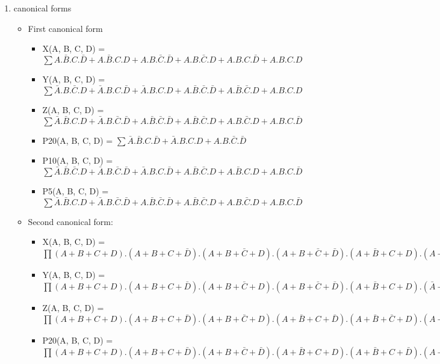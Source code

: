\begin{enumerate}
        
\item canonical forms 
\begin{itemize}
\item First canonical form 
\begin{itemize}
\item X(A, B, C, D) = $\sum A.\bar B.C.\bar D + A.\bar B.C.D + A.B.\bar C.\bar D + A.B.\bar C.D + A.B.C.\bar D + A.B.C.D$
\item Y(A, B, C, D) = $\sum \bar A.B.\bar C.D + \bar A.B.C.\bar D + \bar A.B.C.D + A.\bar B.\bar C.\bar D + A.\bar B.\bar C.D + A.B.C.D$
\item Z(A, B, C, D) = $\sum \bar A.\bar B.C.D + \bar A.B.\bar C.\bar D + A.\bar B.\bar C.\bar D + A.\bar B.\bar C.D + A.B.\bar C.D + A.B.C.\bar D$
\item P20(A, B, C, D) = $\sum \bar A.\bar B.C.\bar D + \bar A.B.C.D + A.B.\bar C.\bar D$
\item P10(A, B, C, D) = $\sum \bar A.\bar B.\bar C.D + \bar A.B.\bar C.\bar D + \bar A.B.C.\bar D + A.\bar B.\bar C.D + A.\bar B.C.D + A.B.C.\bar D$
\item P5(A, B, C, D) = $\sum \bar A.\bar B.C.D + \bar A.B.\bar C.\bar D + A.\bar B.\bar C.\bar D + A.\bar B.\bar C.D + A.B.\bar C.D + A.B.C.\bar D$
\end{itemize}
\item Second canonical form: 
\begin{itemize}
\item X(A, B, C, D) = $\prod (A+B+C+D) . (A+B+C+\bar D) . (A+B+\bar C+D) . (A+B+\bar C+\bar D) . (A+\bar B+C+D) . (A+\bar B+C+\bar D) . (A+\bar B+\bar C+D) . (A+\bar B+\bar C+\bar D) . (\bar A+B+C+D) . (\bar A+B+C+\bar D)$
\item Y(A, B, C, D) = $\prod (A+B+C+D) . (A+B+C+\bar D) . (A+B+\bar C+D) . (A+B+\bar C+\bar D) . (A+\bar B+C+D) . (\bar A+B+\bar C+D) . (\bar A+B+\bar C+\bar D) . (\bar A+\bar B+C+D) . (\bar A+\bar B+C+\bar D) . (\bar A+\bar B+\bar C+D)$
\item Z(A, B, C, D) = $\prod (A+B+C+D) . (A+B+C+\bar D) . (A+B+\bar C+D) . (A+\bar B+C+\bar D) . (A+\bar B+\bar C+D) . (A+\bar B+\bar C+\bar D) . (\bar A+B+\bar C+D) . (\bar A+B+\bar C+\bar D) . (\bar A+\bar B+C+D) . (\bar A+\bar B+\bar C+\bar D)$
\item P20(A, B, C, D) = $\prod (A+B+C+D) . (A+B+C+\bar D) . (A+B+\bar C+\bar D) . (A+\bar B+C+D) . (A+\bar B+C+\bar D) . (A+\bar B+\bar C+D) . (\bar A+B+C+D) . (\bar A+B+C+\bar D) . (\bar A+B+\bar C+D) . (\bar A+B+\bar C+\bar D) . (\bar A+\bar B+C+\bar D) . (\bar A+\bar B+\bar C+D) . (\bar A+\bar B+\bar C+\bar D)$

\end{itemize}
\end{itemize}
\end{enumerate}
